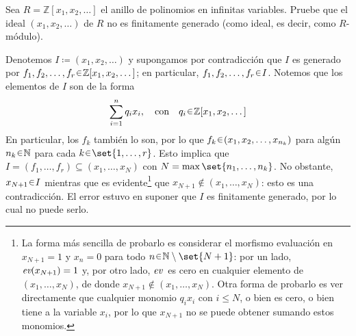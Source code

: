 \begin{ejer}
Sea $R = \mathbb{Z}[x_1, x_2, \ldots ]$ el anillo de polinomios en infinitas variables. Pruebe que el ideal $(x_1, x_2, \ldots)$ de $R$ no es finitamente generado (como ideal, es decir, como $R$-módulo).
\end{ejer}
\begin{sol}[Demostración]
Denotemos $I \coloneq (x_1,x_2,\dots)$ y supongamos por contradicción que $I$ es generado por $f_1,f_2,\dots,f_r \en \mathbb{Z}[x_1,x_2,\dots]$; en particular, $f_1,f_2,\dots,f_r \en I$. Notemos que los elementos de $I$ son de la forma
\[
\sum^n_{i=1}q_ix_i,
\quad\text{con}\quad
q_i \en \mathbb{Z}[x_1,x_2,\dots]
\]
En particular, los $f_k$ también lo son, por lo que $f_k \en (x_1,x_2,\dots,x_{n_k})$ para algún $n_k \en \mathbb{N}$ para cada $k \en \set{1,\dots,r}$. Esto implica que $I = (f_1,\dots,f_r) \subseteq (x_1,\dots,x_N)$ con $N = \max\set{n_1,\dots,n_k}$. No obstante, $x_{N+1} \en I$ mientras que es evidente\footnote{La forma más sencilla de probarlo es considerar el morfismo evaluación en $x_{N+1} = 1$ y $x_{n} = 0$ para todo $n \en \mathbb{N}\setminus\set{N+1}$: por un lado, $\operatorname{\textit{ev}}(x_{N+1})=1$ y, por otro lado, $\operatorname{\textit{ev}}{}$ es cero en cualquier elemento de $(x_1,\dots,x_N)$, de donde $x_{N+1} \notin (x_1,\dots,x_N)$. Otra forma de probarlo es ver directamente que cualquier monomio $q_ix_i$ con $i\leq N$, o bien es cero, o bien tiene a la variable $x_i$, por lo que $x_{N+1}$ no se puede obtener sumando estos monomios.} que $x_{N+1} \notin (x_1,\dots,x_N)$: esto es una contradicción. El error estuvo en suponer que $I$ es finitamente generado, por lo cual no puede serlo.
\end{sol}
